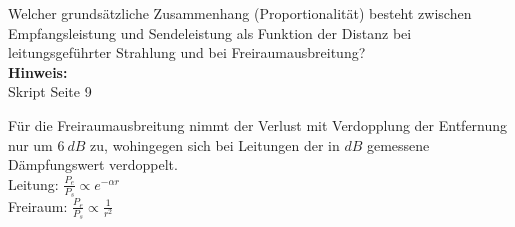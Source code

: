 \begin{question}[section=1,name={Leistungsvergleich Freiraum/Leitung},difficulty=,quantity=2,type=thr,tags={20131210,20130513}]
	Welcher grundsätzliche Zusammenhang (Proportionalität) besteht zwischen Empfangsleistung und Sendeleistung als Funktion der Distanz bei leitungsgeführter Strahlung und bei Freiraumausbreitung?
	\\ \textbf{Hinweis:}\\
	Skript Seite 9
\end{question}
\begin{solution}
	Für die Freiraumausbreitung nimmt der Verlust mit Verdopplung der Entfernung nur um $6~dB$ zu, wohingegen sich bei Leitungen der in $dB$ gemessene Dämpfungswert verdoppelt.\\
	Leitung:  $ \frac{P_e}{P_s} \propto   e^{-\alpha r} $\\
	Freiraum: $ \frac{P_e}{P_s} \propto  \frac{1}{r^2} $
\end{solution}